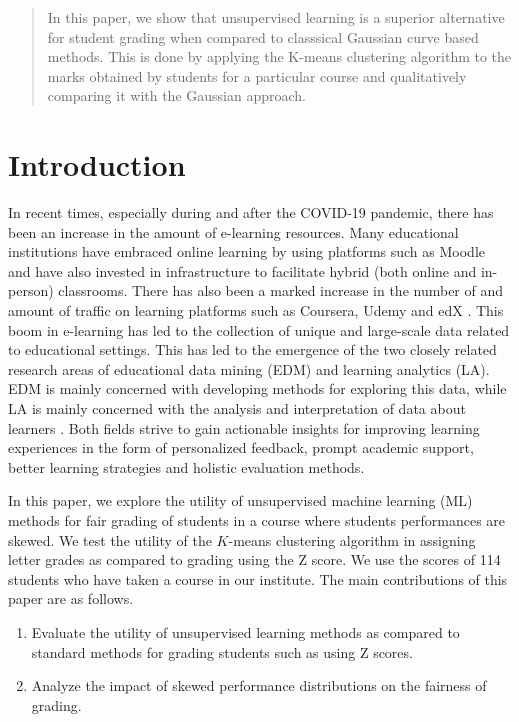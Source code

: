 \documentclass[conference]{IEEEtran}
\begin{document}
\begin{abstract}
	In this paper, we show that unsupervised learning is a superior alternative for student grading when compared to classsical Gaussian curve based methods.  This is done by applying the K-means clustering algorithm to the marks obtained by students for a particular course and qualitatively comparing it with the Gaussian approach.  \end{abstract}

\section{Introduction}
\label{sec:intro}
In recent times, especially during and after the COVID-19 pandemic, there has
been an increase in the amount of e-learning resources. Many educational
institutions have embraced online learning by using platforms such as Moodle and
have also invested in infrastructure to facilitate hybrid (both online and
in-person) classrooms. There has also been a marked increase in the number of
and amount of traffic on learning platforms such as Coursera, Udemy and edX
\cite{royEmergingTrendsApplications2017}. This boom in e-learning has led to the
collection of unique and large-scale data related to educational settings. This
has led to the emergence of the two closely related research areas of
educational data mining (EDM) and learning analytics (LA). EDM is mainly
concerned with developing methods for exploring this data, while LA is mainly
concerned with the analysis and interpretation of data about learners
\cite{romeroEducationalDataMining2020}. Both fields strive to gain actionable
insights for improving learning experiences in the form of personalized
feedback, prompt academic support, better learning strategies and holistic
evaluation methods.

In this paper, we explore the utility of unsupervised machine learning (ML)
methods for fair grading of students in a course where students performances are
skewed. We test the utility of the $K$-means clustering algorithm in assigning
letter grades as compared to grading using the Z score. We use the scores of 114
students who have taken a course in our institute. The main contributions of
this paper are as follows.

\begin{enumerate}
    \item Evaluate the utility of unsupervised learning methods as compared to
    standard methods for grading students such as using Z scores.
    \item Analyze the impact of skewed performance distributions on the fairness
    of grading.
\end{enumerate}
\end{document}
